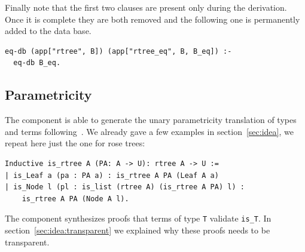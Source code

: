 \documentclass[sigplan,10pt,review]{acmart}\settopmatter{printfolios=true,printccs=false,printacmref=false}
\newcommand{\derive}[1]{\keys{#1}}
\begin{document}
Finally note that the first two clauses are present only during the
derivation. Once it is complete they are both removed and the
following one is permanently added to the data base.

\begin{minipage}{\textwidth}\begin{lstlisting}[]
eq-db (app["rtree", B]) (app["rtree_eq", B, B_eq]) :-
  eq-db B_eq.
\end{lstlisting}\end{minipage}


% 
% 

\subsection{Parametricity} %

The \derive{pram1} component is able to generate the unary
parametricity translation of types and terms
following~\cite{keller:hal-00730913}. We already gave a few
examples in section~\ref{sec:idea}, we repeat here just the
one for rose trees:

\begin{minipage}{\textwidth}\begin{lstlisting}
Inductive is_rtree A (PA: A -> U): rtree A -> U :=
| is_Leaf a (pa : PA a) : is_rtree A PA (Leaf A a)
| is_Node l (pl : is_list (rtree A) (is_rtree A PA) l) :
    is_rtree A PA (Node A l).
\end{lstlisting}\end{minipage}

\noindent
The \derive{pram1P} component synthesizes proofs that terms
of type \lstinline+T+ validate \lstinline+is_T+.
In section~\ref{sec:idea:transparent} we explained why
these proofs needs to be transparent.
\end{document}
